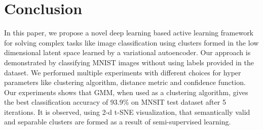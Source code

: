\documentclass[runningheads]{llncs}
\begin{document}
\section{Conclusion}
In this paper, we propose a novel deep learning based active learning framework for solving complex tasks like image classification using clusters formed in the low dimensional latent space learned by a variational autoencoder.
Our approach is demonstrated by classifying MNIST images without using labels provided in the dataset.
We performed multiple experiments with different choices for hyper parameters like clustering algorithm, distance metric and confidence function.
Our experiments shows that GMM, when used as a clustering algorithm,  gives the best classification accuracy of 93.9\% on MNSIT test dataset after 5 iterations.
It is observed, using 2-d t-SNE visualization, that  semantically valid and separable clusters are formed as a result of semi-supervised learning.
\clearpage
%
%
%

%
\end{document}
